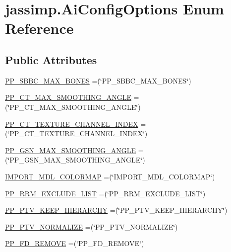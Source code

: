 \hypertarget{enumjassimp_1_1_ai_config_options}{\section{jassimp.\+Ai\+Config\+Options Enum Reference}
\label{enumjassimp_1_1_ai_config_options}
}
\subsection*{Public Attributes}
\begin{DoxyCompactItemize}
\item 
\hyperlink{enumjassimp_1_1_ai_config_options_a044117d630c7f6988ebf8988a121260f}{P\+P\+\_\+\+S\+B\+B\+C\+\_\+\+M\+A\+X\+\_\+\+B\+O\+N\+E\+S} =(\char`\"{}P\+P\+\_\+\+S\+B\+B\+C\+\_\+\+M\+A\+X\+\_\+\+B\+O\+N\+E\+S\char`\"{})
\item 
\hyperlink{enumjassimp_1_1_ai_config_options_a91a508bfe571464e685c1b384386467a}{P\+P\+\_\+\+C\+T\+\_\+\+M\+A\+X\+\_\+\+S\+M\+O\+O\+T\+H\+I\+N\+G\+\_\+\+A\+N\+G\+L\+E} =(\char`\"{}P\+P\+\_\+\+C\+T\+\_\+\+M\+A\+X\+\_\+\+S\+M\+O\+O\+T\+H\+I\+N\+G\+\_\+\+A\+N\+G\+L\+E\char`\"{})
\item 
\hyperlink{enumjassimp_1_1_ai_config_options_ae155df729f404509c744f7baad6e2abd}{P\+P\+\_\+\+C\+T\+\_\+\+T\+E\+X\+T\+U\+R\+E\+\_\+\+C\+H\+A\+N\+N\+E\+L\+\_\+\+I\+N\+D\+E\+X} =(\char`\"{}P\+P\+\_\+\+C\+T\+\_\+\+T\+E\+X\+T\+U\+R\+E\+\_\+\+C\+H\+A\+N\+N\+E\+L\+\_\+\+I\+N\+D\+E\+X\char`\"{})
\item 
\hyperlink{enumjassimp_1_1_ai_config_options_a3b3cd996c1201177c31ee7b2b697c4e1}{P\+P\+\_\+\+G\+S\+N\+\_\+\+M\+A\+X\+\_\+\+S\+M\+O\+O\+T\+H\+I\+N\+G\+\_\+\+A\+N\+G\+L\+E} =(\char`\"{}P\+P\+\_\+\+G\+S\+N\+\_\+\+M\+A\+X\+\_\+\+S\+M\+O\+O\+T\+H\+I\+N\+G\+\_\+\+A\+N\+G\+L\+E\char`\"{})
\item 
\hyperlink{enumjassimp_1_1_ai_config_options_a78ad0d97535fb52c830b6c853e9789c5}{I\+M\+P\+O\+R\+T\+\_\+\+M\+D\+L\+\_\+\+C\+O\+L\+O\+R\+M\+A\+P} =(\char`\"{}I\+M\+P\+O\+R\+T\+\_\+\+M\+D\+L\+\_\+\+C\+O\+L\+O\+R\+M\+A\+P\char`\"{})
\item 
\hyperlink{enumjassimp_1_1_ai_config_options_a167d4308d67e41973196793a8d5eba24}{P\+P\+\_\+\+R\+R\+M\+\_\+\+E\+X\+C\+L\+U\+D\+E\+\_\+\+L\+I\+S\+T} =(\char`\"{}P\+P\+\_\+\+R\+R\+M\+\_\+\+E\+X\+C\+L\+U\+D\+E\+\_\+\+L\+I\+S\+T\char`\"{})
\item 
\hyperlink{enumjassimp_1_1_ai_config_options_a85db3bbe3bfcffb5365fddd9a6e0894a}{P\+P\+\_\+\+P\+T\+V\+\_\+\+K\+E\+E\+P\+\_\+\+H\+I\+E\+R\+A\+R\+C\+H\+Y} =(\char`\"{}P\+P\+\_\+\+P\+T\+V\+\_\+\+K\+E\+E\+P\+\_\+\+H\+I\+E\+R\+A\+R\+C\+H\+Y\char`\"{})
\item 
\hyperlink{enumjassimp_1_1_ai_config_options_a62756ef9d485863cccb64bba66fdc211}{P\+P\+\_\+\+P\+T\+V\+\_\+\+N\+O\+R\+M\+A\+L\+I\+Z\+E} =(\char`\"{}P\+P\+\_\+\+P\+T\+V\+\_\+\+N\+O\+R\+M\+A\+L\+I\+Z\+E\char`\"{})
\item 
\hyperlink{enumjassimp_1_1_ai_config_options_ac70de20a5158550327631e618b20cc7c}{P\+P\+\_\+\+F\+D\+\_\+\+R\+E\+M\+O\+V\+E} =(\char`\"{}P\+P\+\_\+\+F\+D\+\_\+\+R\+E\+M\+O\+V\+E\char`\"{})
\end{DoxyCompactItemize}


